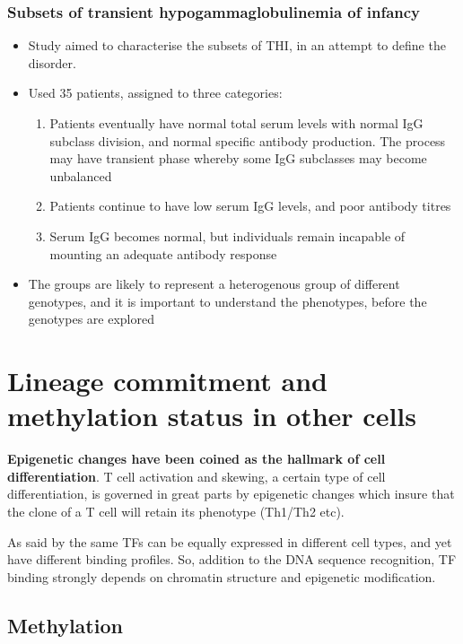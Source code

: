 \documentclass[12pt]{article}
\begin{document}
	\subsubsection{Subsets of transient hypogammaglobulinemia of infancy \citeauthor{Dalal98} \citeyear{Dalal98}}
	
	\begin{itemize}
		\item Study aimed to characterise the subsets of THI, in an attempt to define the disorder. 
		\item Used 35 patients, assigned to three categories:
		\begin{enumerate}
			\item Patients eventually have normal total serum levels with normal IgG subclass division, and normal specific antibody production. The process may have transient phase whereby some IgG subclasses may become unbalanced 
			\item Patients continue to have low serum IgG levels, and poor antibody titres
			\item Serum IgG becomes normal, but individuals remain incapable of mounting an adequate antibody response
		\end{enumerate}
		\item The groups are likely to represent a heterogenous group of different genotypes, and it is important to understand the phenotypes, before the genotypes are explored
	\end{itemize}
	
	\section{Lineage commitment and methylation status in other cells}
	
	{\bf Epigenetic changes have been coined as the hallmark of cell differentiation}. T cell activation and skewing, a certain type of cell differentiation, is governed in great parts by epigenetic changes which insure that the clone of a T cell will retain its phenotype (Th1/Th2 etc).
	
	As said by \citet{Choukrallah14} the same TFs can be equally expressed in different cell types, and yet have different binding profiles. So, addition to the DNA sequence recognition, TF binding strongly depends on chromatin structure and epigenetic modification.
	
	\subsection{Methylation}
	
\end{document}
